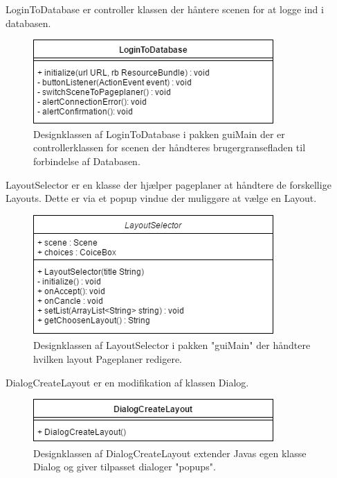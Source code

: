 LoginToDatabase er controller klassen der håntere scenen for at logge ind i databasen. 
      \begin{figure}[H]
      \includegraphics[width=\linewidth]{elaborationsdokumentet/figurer/design/designklasser/Designklasse-LoginToDatabase.png}
      \caption{Designklassen af LoginToDatabase i pakken guiMain der er controllerklassen for scenen der håndteres brugergransefladen til forbindelse af Databasen.}
      \label{Designklasse-LoginToDatabase}
  \end{figure}
  
LayoutSelector er en klasse der hjælper pageplaner at håndtere de forskellige Layouts. Dette er via et popup vindue der muliggøre at vælge en Layout.
    \begin{figure}[H]
      \includegraphics[width=\linewidth]{elaborationsdokumentet/figurer/design/designklasser/Designklasse-LayoutSelector.png}
      \caption{Designklassen af LayoutSelector i pakken "guiMain" der håndtere hvilken layout Pageplaner redigere.}
      \label{Designklasse-LayoutSelector}
\end{figure}
      
DialogCreateLayout er en modifikation af klassen Dialog.
\begin{figure}[H]
      \includegraphics[width=\linewidth]{elaborationsdokumentet/figurer/design/designklasser/Designklasse-DialogCreateLayout.png}
      \caption{Designklassen af DialogCreateLayout extender Javas egen klasse Dialog og giver tilpasset dialoger "popups".}
      \label{Designklasse-DialogCreateLayout}
  \end{figure}
  
